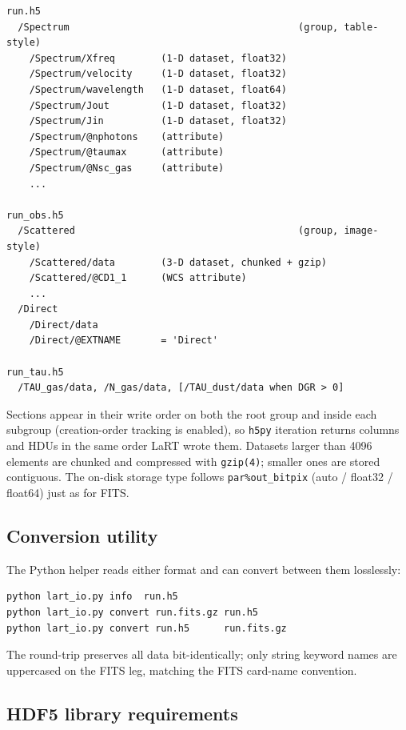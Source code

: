 \documentclass[english,a4paper]{my_memo}
\newcommand{\parm}[1]{\texttt{par\%#1}}
\begin{document}
\begin{lstlisting}[numbers=none,basicstyle=\ttfamily\small]
run.h5
  /Spectrum                                        (group, table-style)
    /Spectrum/Xfreq        (1-D dataset, float32)
    /Spectrum/velocity     (1-D dataset, float32)
    /Spectrum/wavelength   (1-D dataset, float64)
    /Spectrum/Jout         (1-D dataset, float32)
    /Spectrum/Jin          (1-D dataset, float32)
    /Spectrum/@nphotons    (attribute)
    /Spectrum/@taumax      (attribute)
    /Spectrum/@Nsc_gas     (attribute)
    ...

run_obs.h5
  /Scattered                                       (group, image-style)
    /Scattered/data        (3-D dataset, chunked + gzip)
    /Scattered/@CD1_1      (WCS attribute)
    ...
  /Direct
    /Direct/data
    /Direct/@EXTNAME       = 'Direct'

run_tau.h5
  /TAU_gas/data, /N_gas/data, [/TAU_dust/data when DGR > 0]
\end{lstlisting}

Sections appear in their write order on both the root group and inside
each subgroup (creation-order tracking is enabled), so \texttt{h5py}
iteration returns columns and HDUs in the same order LaRT wrote them.
Datasets larger than 4096 elements are chunked and compressed with
\texttt{gzip(4)}; smaller ones are stored contiguous.  The on-disk
storage type follows \parm{out\_bitpix} (auto / float32 / float64) just
as for FITS.

\subsection{Conversion utility}

The Python helper  reads either format and can
convert between them losslessly:

\begin{lstlisting}[language=bash,numbers=none]
python lart_io.py info  run.h5
python lart_io.py convert run.fits.gz run.h5
python lart_io.py convert run.h5      run.fits.gz
\end{lstlisting}

The round-trip preserves all data bit-identically; only string keyword
names are uppercased on the FITS leg, matching the FITS card-name
convention.

\subsection{HDF5 library requirements}
\end{document}
